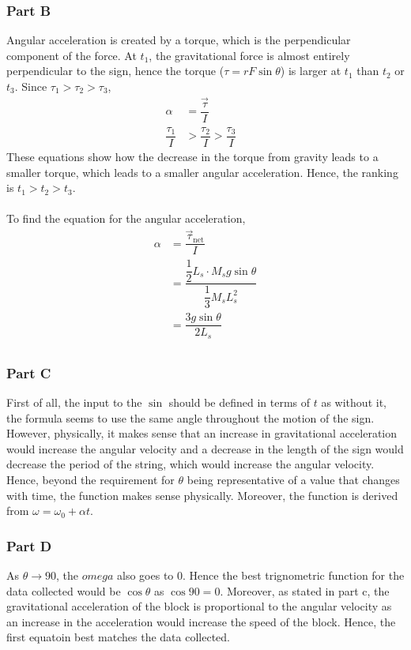\documentclass[]{scrartcl}
\begin{document}
\subsubsection*{Part B}
  Angular acceleration is created by a torque, which is the perpendicular component of the force. At $t_1$, the gravitational force is almost entirely perpendicular to the sign, hence the torque ($\tau = rF\sin\theta$) is larger at $t_1$ than $t_2$ or $t_3$. Since $\tau_1 > \tau_2 > \tau_3$,
  \begin{align*}
    \alpha &= \dfrac{\vec{\tau}}{I} &\\
    \dfrac{\tau_1}{I} &> \dfrac{\tau_2}{I} > \dfrac{\tau_3}{I}
  \end{align*}
  These equations show how the decrease in the torque from gravity leads to a smaller torque, which leads to a smaller angular acceleration. Hence, the ranking is $\boxed{t_1 > t_2 > t_3}$. \\ \\
  To find the equation for the angular acceleration,
  \begin{align*}
    \alpha &= \dfrac{\vec{\tau}_{\textrm{net}}}{I} \\
     &= \dfrac{\dfrac12 L_s \cdot M_s g\sin\theta}{\dfrac13 M_sL_s^2} \\
     &= \boxed{\dfrac{3g\sin\theta}{2L_s}} \\
  \end{align*}
\subsubsection*{Part C}
  First of all, the input to the $\sin$ should be defined in terms of $t$ as without it, the formula seems to use the same angle throughout the motion of the sign. However, physically, it makes sense that an increase in gravitational acceleration would increase the angular velocity and a decrease in the length of the sign would decrease the period of the string, which would increase the angular velocity. Hence, beyond the requirement for $\theta$ being representative of a value that changes with time, the function makes sense physically. Moreover, the function is derived from $\omega = \omega_0 + \alpha t$.
\subsubsection*{Part D}
  As $\theta \rightarrow 90$, the $omega$  also goes to 0. Hence the best trignometric function for the data collected would be $\cos\theta$ as $\cos 90 = 0$. Moreover, as stated in part c, the gravitational acceleration of the block is proportional to the angular velocity as an increase in the acceleration would increase the speed of the block. Hence, the first equatoin best matches the data collected.
\end{document}
